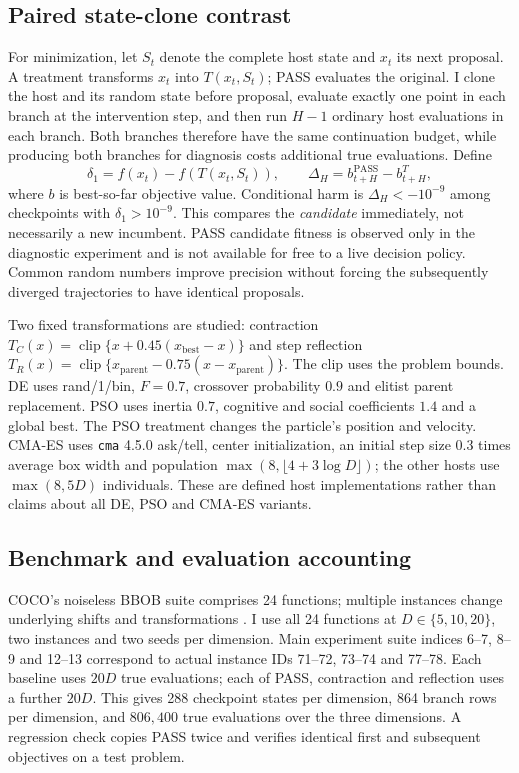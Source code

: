 \documentclass[11pt,a4paper]{article}
\begin{document}
\subsection{Paired state-clone contrast}
For minimization, let $S_t$ denote the complete host state and $x_t$ its next proposal. A treatment transforms $x_t$ into $T(x_t,S_t)$; PASS evaluates the original. I clone the host and its random state before proposal, evaluate exactly one point in each branch at the intervention step, and then run $H-1$ ordinary host evaluations in each branch. Both branches therefore have the same continuation budget, while producing both branches for diagnosis costs additional true evaluations. Define
\begin{equation}
\delta_1=f(x_t)-f(T(x_t,S_t)),\qquad
\Delta_H=b_{t+H}^{\mathrm{PASS}}-b_{t+H}^{T},
\end{equation}
where $b$ is best-so-far objective value. Conditional harm is $\Delta_H<-10^{-9}$ among checkpoints with $\delta_1>10^{-9}$. This compares the \emph{candidate} immediately, not necessarily a new incumbent. PASS candidate fitness is observed only in the diagnostic experiment and is not available for free to a live decision policy. Common random numbers improve precision without forcing the subsequently diverged trajectories to have identical proposals.

Two fixed transformations are studied: contraction $T_C(x)=\operatorname{clip}\{x+0.45(x_{\mathrm{best}}-x)\}$ and step reflection $T_R(x)=\operatorname{clip}\{x_{\mathrm{parent}}-0.75(x-x_{\mathrm{parent}})\}$. The clip uses the problem bounds. DE uses rand/1/bin, $F=0.7$, crossover probability $0.9$ and elitist parent replacement. PSO uses inertia $0.7$, cognitive and social coefficients $1.4$ and a global best. The PSO treatment changes the particle's position and velocity. CMA-ES uses \texttt{cma} 4.5.0 ask/tell, center initialization, an initial step size $0.3$ times average box width and population $\max(8,\lfloor4+3\log D\rfloor)$; the other hosts use $\max(8,5D)$ individuals. These are defined host implementations rather than claims about all DE, PSO and CMA-ES variants.

\subsection{Benchmark and evaluation accounting}
COCO's noiseless BBOB suite comprises 24 functions; multiple instances change underlying shifts and transformations \cite{hansen2009bbob,hansen2020coco}. I use all 24 functions at $D\in\{5,10,20\}$, two instances and two seeds per dimension. Main experiment suite indices 6--7, 8--9 and 12--13 correspond to actual instance IDs 71--72, 73--74 and 77--78. Each baseline uses $20D$ true evaluations; each of PASS, contraction and reflection uses a further $20D$. This gives 288 checkpoint states per dimension, 864 branch rows per dimension, and $806{,}400$ true evaluations over the three dimensions. A regression check copies PASS twice and verifies identical first and subsequent objectives on a test problem.
\end{document}
